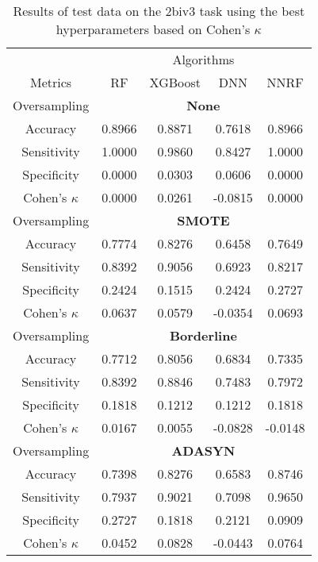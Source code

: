 \begin{table}[!htb]
\centering
\caption{Results of test data on the 2biv3 task using the best hyperparameters based on Cohen's $\kappa$}
\label{tab:2biv3_test_results}
\begin{tabular}{c | c c c c}
\hline
 & \multicolumn{4}{c}{Algorithms}\\ 
Metrics &RF & XGBoost & DNN & NNRF\\ 
\hline
Oversampling &\multicolumn{4}{|c}{\textbf{None}}\\ 
\hline
Accuracy & 0.8966 & 0.8871 & 0.7618 & 0.8966\\ 
Sensitivity & 1.0000 & 0.9860 & 0.8427 & 1.0000\\ 
Specificity & 0.0000 & 0.0303 & 0.0606 & 0.0000\\ 
Cohen's $\kappa$ & 0.0000 & 0.0261 & -0.0815 & 0.0000\\ 
\hline
Oversampling &\multicolumn{4}{|c}{\textbf{SMOTE}}\\ 
\hline
Accuracy & 0.7774 & 0.8276 & 0.6458 & 0.7649\\ 
Sensitivity & 0.8392 & 0.9056 & 0.6923 & 0.8217\\ 
Specificity & 0.2424 & 0.1515 & 0.2424 & 0.2727\\ 
Cohen's $\kappa$ & 0.0637 & 0.0579 & -0.0354 & 0.0693\\ 
\hline
Oversampling &\multicolumn{4}{|c}{\textbf{Borderline}}\\ 
\hline
Accuracy & 0.7712 & 0.8056 & 0.6834 & 0.7335\\ 
Sensitivity & 0.8392 & 0.8846 & 0.7483 & 0.7972\\ 
Specificity & 0.1818 & 0.1212 & 0.1212 & 0.1818\\ 
Cohen's $\kappa$ & 0.0167 & 0.0055 & -0.0828 & -0.0148\\ 
\hline
Oversampling &\multicolumn{4}{|c}{\textbf{ADASYN}}\\ 
\hline
Accuracy & 0.7398 & 0.8276 & 0.6583 & 0.8746\\ 
Sensitivity & 0.7937 & 0.9021 & 0.7098 & 0.9650\\ 
Specificity & 0.2727 & 0.1818 & 0.2121 & 0.0909\\ 
Cohen's $\kappa$ & 0.0452 & 0.0828 & -0.0443 & 0.0764\\ 
\hline
\end{tabular}
\end{table}


